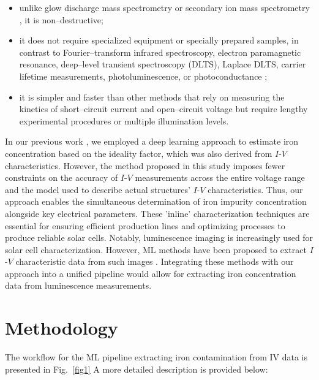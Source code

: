 \documentclass[a4paper,fleqn]{cas-sc}
\begin{document}
\begin{itemize}
    \item unlike glow discharge mass spectrometry or secondary ion mass spectrometry \cite{DiSabatino2014}, it is non--destructive;
    \item it does not require specialized equipment or specially prepared samples, in contrast to Fourier--transform infrared spectroscopy, electron paramagnetic resonance, deep--level transient spectroscopy (DLTS), Laplace DLTS, carrier lifetime measurements, photoluminescence, or photoconductance \cite{Schroder2006, HowMuchPhysics, LaplDLTS, Rein2, Schmidt2005, FeMethod2012, Goodarzi2017};
    \item it is simpler and faster than other methods that rely on measuring the kinetics of short--circuit current \cite{Olikh2021JAP} and open--circuit voltage \cite{Herguth2022} but require lengthy experimental procedures or multiple illumination levels.
\end{itemize}


In our previous work \cite{Olikh2022PPV}, we employed a deep learning approach to estimate iron concentration based on the ideality factor, which was also derived from $I$-$V$ characteristics. 
However, the method proposed in this study imposes fewer constraints on the accuracy of $I$-$V$ measurements across the entire voltage range and the model used to describe actual structures' $I$-$V$ characteristics. 
Thus, our approach enables the simultaneous determination of iron impurity concentration alongside key electrical parameters. 
These 'inline' characterization techniques are essential for ensuring efficient production lines and optimizing processes to produce reliable solar cells. 
Notably, luminescence imaging is increasingly used for solar cell characterization. 
However, ML methods have been proposed to extract $I$-$V$ characteristic data from such images \cite{Kunze2023, Battaglia2023}. 
Integrating these methods with our approach into a unified pipeline would allow for extracting iron concentration data from luminescence measurements.

\section{Methodology}
\par
The workflow for the ML pipeline extracting iron contamination from IV data is presented in Fig.~\ref{fig1} A more detailed description is provided below:
\end{document}
